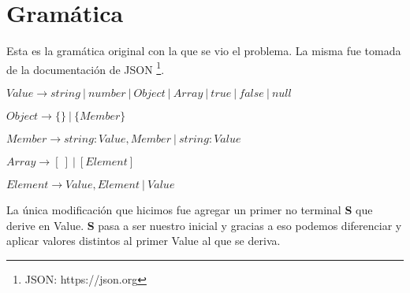 \section{Gramática}

Esta es la gramática original con la que se vio el problema. La misma fue tomada de la documentación de JSON \footnote{JSON: https://json.org}.

$Value \xrightarrow{} \textit{string}\ |\ \textit{number}\ |\ Object\ |\ Array\ |\ \textit{true}\ |\ \textit{false}\ |\ \textit{null}$

$Object \xrightarrow{} \{\}\ |\ \{ Member \}$

$Member \xrightarrow{} \textit{string}:Value,Member\ |\  \textit{string}:Value$

$Array \xrightarrow{} [\ ]\ |\ [Element]$

$Element \xrightarrow{} Value,Element\ |\ Value$

La única modificación que hicimos fue agregar un primer no terminal \textbf{S} que derive en Value. \textbf{S} pasa a ser nuestro inicial y gracias a eso podemos diferenciar y aplicar valores distintos al primer Value al que se deriva.
